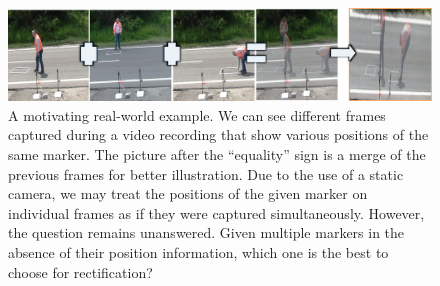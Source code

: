 \begin{figure}[t]
    \centerline{\includegraphics[width=\linewidth]{figures/homography/markers_on_the_road.png}}
    \caption[Multiple markers on the road]{A motivating real-world example. We can see different frames captured during a video recording that show various positions of the same marker. The picture after the ``equality'' sign is a merge of the previous frames for better illustration. Due to the use of a static camera, we may treat the positions of the given marker on individual frames as if they were captured simultaneously. However, the question remains unanswered. Given multiple markers in the absence of their position information, which one is the best to choose for rectification?}
    \label{fig:MultipleMarkersOnRoad}
\end{figure}
